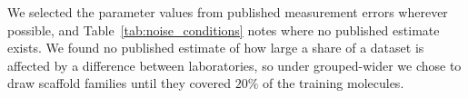 We selected the parameter values from published measurement errors wherever possible, and Table~\ref{tab:noise_conditions} notes where no published estimate exists.
We found no published estimate of how large a share of a dataset is affected by a difference between laboratories, so under grouped-wider we chose to draw scaffold families until they covered $20\%$ of the training molecules.
